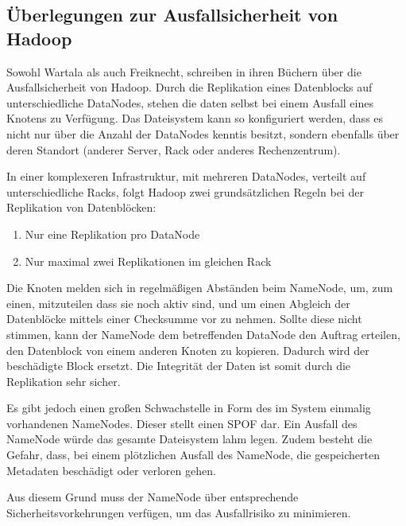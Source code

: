 
\subsection{Überlegungen zur Ausfallsicherheit von Hadoop}
Sowohl Wartala als auch Freiknecht, schreiben in ihren Büchern über die Ausfallsicherheit von Hadoop. Durch die Replikation eines Datenblocks auf unterschiedliche DataNodes, stehen die daten selbst bei einem Ausfall eines Knotens zu Verfügung. Das Dateisystem kann so konfiguriert werden, dass es nicht nur über die Anzahl der DataNodes kenntis besitzt, sondern ebenfalls über deren Standort (anderer Server, Rack oder anderes Rechenzentrum).

In einer komplexeren Infrastruktur, mit mehreren DataNodes, verteilt auf unterschiedliche Racks, folgt Hadoop zwei grundsätzlichen Regeln bei der Replikation von Datenblöcken:

\begin{enumerate}
	\item Nur eine Replikation pro DataNode
	\item Nur maximal zwei Replikationen im gleichen Rack
\end{enumerate}

Die Knoten melden sich in regelmäßigen Abständen beim NameNode, um, zum einen, mitzuteilen dass sie noch aktiv sind, und um einen Abgleich der Datenblöcke mittels einer Checksumme vor zu nehmen. Sollte diese nicht stimmen, kann der NameNode dem betreffenden DataNode den Auftrag erteilen, den Datenblock von einem anderen Knoten zu kopieren. Dadurch wird der beschädigte Block ersetzt. Die Integrität der Daten ist somit durch die Replikation sehr sicher.

Es gibt jedoch einen großen Schwachstelle in Form des im System einmalig vorhandenen NameNodes. Dieser stellt einen \ac{SPOF} dar. Ein Ausfall des NameNode würde das gesamte Dateisystem lahm legen. Zudem besteht die Gefahr, dass, bei einem plötzlichen Ausfall des NameNode, die gespeicherten Metadaten beschädigt oder verloren gehen.

Aus diesem Grund muss der NameNode über entsprechende Sicherheitsvorkehrungen verfügen, um das Ausfallrisiko zu minimieren.


